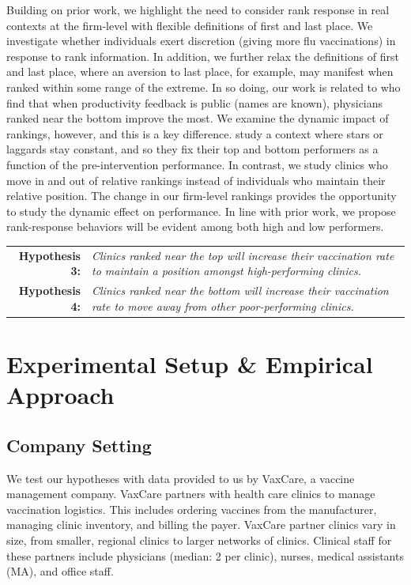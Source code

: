  Building on prior work, we highlight the need to consider rank response in real contexts at the firm-level with flexible definitions of first and last place. We investigate whether individuals exert discretion (giving more flu vaccinations) in response to rank information. In addition, we further relax the definitions of first and last place, where an aversion to last place, for example, may manifest when ranked within some range of the extreme. In so doing, our work is related to \cite{Song2018a} who find that when productivity feedback is public (names are known), physicians ranked near the bottom improve the most. We examine the dynamic impact of rankings, however, and this is a key difference. \cite{Song2018a} study a context where stars or laggards stay constant, and so they fix their top and bottom performers as a function of the pre-intervention performance. In contrast, we study clinics who move in and out of relative rankings instead of individuals who maintain their relative position. The change in our firm-level rankings provides the opportunity to study the dynamic effect on performance. In line with prior work, we propose rank-response behaviors will be evident among both high and low performers. 

 \medskip \noindent
 \begin{tabularx} {\linewidth}{ r X }
    \textbf{Hypothesis 3:} & \textit{Clinics ranked near the top will increase their vaccination rate to maintain a position amongst high-performing clinics.} \\
    \textbf{Hypothesis 4:} & \textit{Clinics ranked near the bottom will increase their vaccination rate to move away from other poor-performing clinics.}
 \end{tabularx}   %
 
\section{Experimental Setup \& Empirical Approach} \label{empirics}
 \subsection{Company Setting}
 We test our hypotheses with data provided to us by VaxCare, a vaccine management company. VaxCare partners with health care clinics to manage vaccination logistics. This includes ordering vaccines from the manufacturer, managing clinic inventory, and billing the payer. VaxCare partner clinics vary in size, from smaller, regional clinics to larger networks of clinics. Clinical staff for these partners include physicians (median: 2 per clinic), nurses, medical assistants (MA), and office staff.
 
